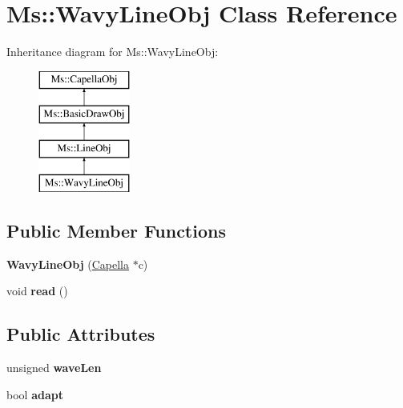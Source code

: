 \hypertarget{class_ms_1_1_wavy_line_obj}{}\section{Ms\+:\+:Wavy\+Line\+Obj Class Reference}
\label{class_ms_1_1_wavy_line_obj}
Inheritance diagram for Ms\+:\+:Wavy\+Line\+Obj\+:\begin{figure}[H]
\begin{center}
\leavevmode
\includegraphics[height=4.000000cm]{class_ms_1_1_wavy_line_obj}
\end{center}
\end{figure}
\subsection*{Public Member Functions}
\begin{DoxyCompactItemize}
\item 
\mbox{\label{class_ms_1_1_wavy_line_obj_a0e8b908dd7c967a2264e68a65a1b6dd1}} 
{\bfseries Wavy\+Line\+Obj} (\hyperlink{class_ms_1_1_capella}{Capella} $\ast$c)
\item 
\mbox{\label{class_ms_1_1_wavy_line_obj_a845e6b25322610c0e002da363059c98b}} 
void {\bfseries read} ()
\end{DoxyCompactItemize}
\subsection*{Public Attributes}
\begin{DoxyCompactItemize}
\item 
\mbox{\label{class_ms_1_1_wavy_line_obj_ab542b55950d33b821760894f82a3b587}} 
unsigned {\bfseries wave\+Len}
\item 
\mbox{\label{class_ms_1_1_wavy_line_obj_ad9fd2786613fffa5d5fa320244ae49de}} 
bool {\bfseries adapt}
\end{DoxyCompactItemize}
